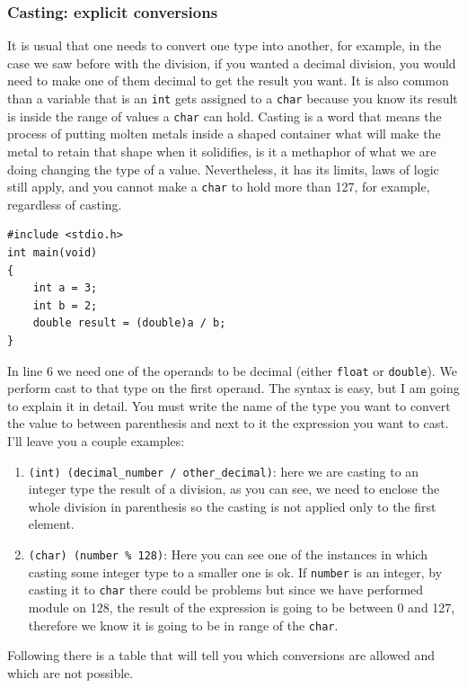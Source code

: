 \documentclass[a4paper]{article}
\begin{document}
\subsubsection{Casting: explicit conversions}
It is usual that one needs to convert one type into another, for example, in the
case we saw before with the division, if you wanted a decimal division, you
would need to make one of them decimal to get the result you want. It is also
common than a variable that is an \texttt{int} gets assigned to a \texttt{char}
because you know its result is inside the range of values a \texttt{char} can
hold. Casting is a word that means the process of putting molten metals inside
a shaped container what will make the metal to retain that shape when it
solidifies, is it a methaphor of what we are doing changing the type of a value.
Nevertheless, it has its limits, laws of logic still apply, and you
cannot make a \texttt{char} to hold more than 127, for example, regardless of
casting.

\noindent
\begin{minipage}[H]{\linewidth}
\mbox{}
\begin{lstlisting}[style=C, caption={Casting example},
label={lst:castingExample}]
#include <stdio.h>
int main(void)
{
    int a = 3;
    int b = 2;
    double result = (double)a / b;
}
\end{lstlisting}
\end{minipage}

In line 6 we need one of the operands to be decimal (either \texttt{float} or
\texttt{double}). We perform cast to that type on the first operand. The syntax
is easy, but I am going to explain it in detail. You must write the name
of the type you want to convert the value to between parenthesis and next to it
the expression you want to cast. I'll leave you a couple examples:
\begin{enumerate}
\item \lstinline[style=C]!(int) (decimal_number / other_decimal)!: here we are
casting to an integer type the result of a division, as you can see, we need
to enclose the whole division in parenthesis so the casting is not applied only
to the first element.
\item \lstinline[style=C]!(char) (number % 128)!: Here you can see one of the
instances in which casting some integer type to a smaller one is ok. If
\texttt{number} is an integer, by casting it to \verb!char! there could be
problems but since we have performed module on 128, the result of the expression
is going to be between 0 and 127, therefore we know it is going to be in range
of the \texttt{char}.
\end{enumerate}
Following there is a table that will tell you which conversions are allowed and which
are not possible.
\end{document}
